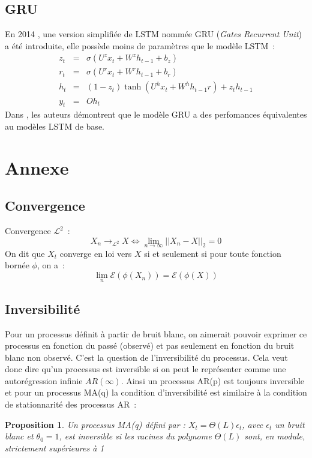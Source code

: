 \documentclass[11pt]{scrartcl} %
\newtheorem{pro}[theorem]{Proposition}
\begin{document}
\subsection{GRU}
En 2014 \cite{GRU}, une version simplifiée de LSTM nommée GRU (\textit{Gates Recurrent Unit}) a été introduite, elle possède moins de paramètres que le modèle LSTM~:
\begin{eqnarray}
z_t&=&\sigma\left(U^zx_t+W^zh_{t-1}+b_z\right)\\
r_t&=&\sigma\left(U^rx_t+W^rh_{t-1}+b_r\right)\\
h_t&=&(1-z_t)\tanh\left(U^hx_t+W^hh_{t-1}r\right)+z_th_{t-1}\\
y_t&=&Oh_t
\end{eqnarray}
Dans \cite{PerfLstmGru}, les auteurs démontrent que le modèle GRU a des perfomances équivalentes au modèles LSTM de base.
\section{Annexe}
\subsection{Convergence}
Convergence $\mathcal{L}^2$~:
$$
X_n\rightarrow_{\mathcal{L^2}} X \Leftrightarrow  \lim_{n\rightarrow \infty}||X_n-X||_2=0
$$
On dit que $X_t$ converge en loi vers $X$ si et seulement si pour toute fonction bornée $\phi$, on a~:~
$$
\lim_{n}\mathcal{E}(\phi(X_n))=\mathcal{E}\left(\phi(X)\right)
$$
\subsection{Inversibilité}
Pour un processus définit à partir de bruit blanc, on aimerait pouvoir exprimer ce processus en fonction du passé (observé) et pas seulement en fonction du bruit blanc non observé. C'est la question de l'inversibilité du processus. Cela veut donc dire qu'un processus est inversible si on peut le représenter comme une autorégression infinie $AR(\infty)$. Ainsi un processus AR(p) est toujours inversible et pour un processus MA(q) la condition d'inversibilité est similaire à la condition de stationnarité des processus AR~:
\begin{pro}
Un processus MA(q) défini par : $X_t=\Theta(L)\epsilon_t$, avec $\epsilon_t$ un bruit blanc et $\theta_0=1$, est inversible si les racines du polynome $ \Theta(L)$ sont, en module, strictement supérieures à 1
\end{pro}
\end{document}
